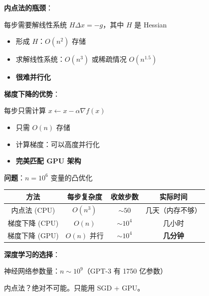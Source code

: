 \documentclass[12pt, a4paper]{ctexart}
\begin{document}
\begin{gpubox}

\textbf{内点法的瓶颈}：

每步需要解线性系统 $H \Delta x = -g$，其中 $H$ 是 Hessian

\begin{itemize}
    \item 形成 $H$：$O(n^2)$ 存储
    \item 求解线性系统：$O(n^3)$ 或稀疏情况 $O(n^{1.5})$
    \item \textbf{很难并行化}
\end{itemize}

\textbf{梯度下降的优势}：

每步只需计算 $x \leftarrow x - \alpha \nabla f(x)$

\begin{itemize}
    \item 只需 $O(n)$ 存储
    \item 计算梯度：可以高度并行化
    \item \textbf{完美匹配 GPU 架构}
\end{itemize}

\end{gpubox}

\begin{blackboard}[数值对比]

\textbf{问题}：$n = 10^6$ 变量的凸优化

\begin{center}
\begin{tabular}{c|c|c|c}
方法 & 每步复杂度 & 收敛步数 & 实际时间 \\
\hline
内点法 (CPU) & $O(n^3)$ & $\sim 50$ & 几天（内存不够） \\
梯度下降 (CPU) & $O(n)$ & $\sim 10^4$ & 几小时 \\
梯度下降 (GPU) & $O(n)$ 并行 & $\sim 10^4$ & \textbf{几分钟}
\end{tabular}
\end{center}

\textbf{深度学习的选择}：

神经网络参数量：$n \sim 10^9$（GPT-3 有 1750 亿参数）

内点法？绝对不可能。只能用 SGD + GPU。

\end{blackboard}
\end{document}
